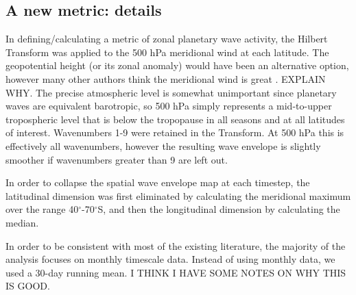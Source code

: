 \subsection{A new metric: details}

In defining/calculating a metric of zonal planetary wave activity, the Hilbert Transform was applied to the 500 hPa meridional wind at each latitude. The geopotential height (or its zonal anomaly) would have been an alternative option, however many other authors think the meridional wind is great \citep[e.g.][p.365]{Hope2014}. EXPLAIN WHY. The precise atmospheric level is somewhat unimportant since planetary waves are equivalent barotropic, so 500 hPa simply represents a mid-to-upper tropospheric level that is below the tropopause in all seasons and at all latitudes of interest. Wavenumbers 1-9 were retained in the Transform. At 500 hPa this is effectively all wavenumbers, however the resulting wave envelope is slightly smoother if wavenumbers greater than 9 are left out.

In order to collapse the spatial wave envelope map at each timestep, the latitudinal dimension was first eliminated by calculating the meridional maximum over the range 40$^{\circ}$-70$^{\circ}$S, and then the longitudinal dimension by calculating the median.

In order to be consistent with most of the existing literature, the majority of the analysis focuses on monthly timescale data. Instead of using monthly data, we used a 30-day running mean. I THINK I HAVE SOME NOTES ON WHY THIS IS GOOD.


